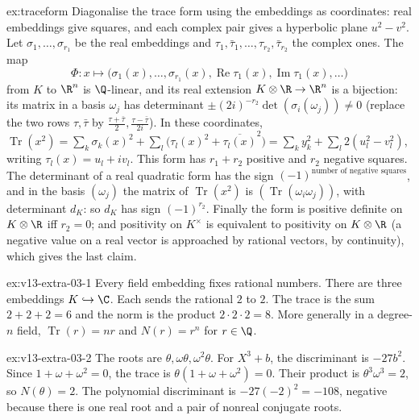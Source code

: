 \begin{solution}{ex:traceform}
\idea Diagonalise the trace form using the embeddings as coordinates: real embeddings give squares, and each complex pair
gives a hyperbolic plane $u^2-v^2$.
\writeup Let $\sigma_1,\dots,\sigma_{r_1}$ be the real embeddings and $\tau_1,\bar\tau_1,\dots,\tau_{r_2},\bar\tau_{r_2}$
the complex ones. The map
\[
\Phi:x\mapsto\bigl(\sigma_1(x),\dots,\sigma_{r_1}(x),\operatorname{Re}\tau_1(x),\operatorname{Im}\tau_1(x),\dots\bigr)
\]
from $K$ to $\R^n$ is $\Q$-linear, and its real extension $K\otimes\R\to\R^n$ is a bijection: its
matrix in a basis $\omega_j$ has determinant $\pm(2i)^{-r_2}\det(\sigma_i(\omega_j))\ne0$ (replace the two rows $\tau,\bar
\tau$ by $\frac{\tau+\bar\tau}2,\frac{\tau-\bar\tau}{2i}$). In these coordinates,
$\operatorname{Tr}(x^2)=\sum_k\sigma_k(x)^2+\sum_l\bigl(\tau_l(x)^2+\overline{\tau_l(x)}^2\bigr)=\sum_ky_k^2+
\sum_l2(u_l^2-v_l^2)$, writing $\tau_l(x)=u_l+iv_l$. This form has $r_1+r_2$ positive and $r_2$ negative squares. The
determinant of a real quadratic form has the sign $(-1)^{\text{number of negative squares}}$, and in the basis
$(\omega_j)$ the matrix of $\operatorname{Tr}(x^2)$ is $(\operatorname{Tr}(\omega_i\omega_j))$, with determinant $d_K$:
so $d_K$ has sign $(-1)^{r_2}$. Finally the form is positive definite on $K\otimes\R$ iff $r_2=0$; and positivity on
$K^\times$ is equivalent to positivity on $K\otimes\R$ (a negative value on a real vector is approached by rational
vectors, by continuity), which gives the last claim.
\end{solution}

\begin{solution}{ex:v13-extra-03-1}
\idea Every field embedding fixes rational numbers.
\writeup There are three embeddings $K\hookrightarrow\C$. Each sends the rational $2$ to $2$. The trace is the sum $2+2+2=6$ and the norm is the product $2\cdot2\cdot2=8$. More generally in a degree-$n$ field, $\operatorname{Tr}(r)=nr$ and $N(r)=r^n$ for $r\in\Q$.
\end{solution}

\begin{solution}{ex:v13-extra-03-2}
\idea The roots are $\theta,\omega\theta,\omega^2\theta$. For $X^3+b$, the discriminant is $-27b^2$.
\writeup Since $1+\omega+\omega^2=0$, the trace is $\theta(1+\omega+\omega^2)=0$. Their product is $\theta^3\omega^3=2$, so $N(\theta)=2$. The polynomial discriminant is $-27(-2)^2=-108$, negative because there is one real root and a pair of nonreal conjugate roots.
\end{solution}

